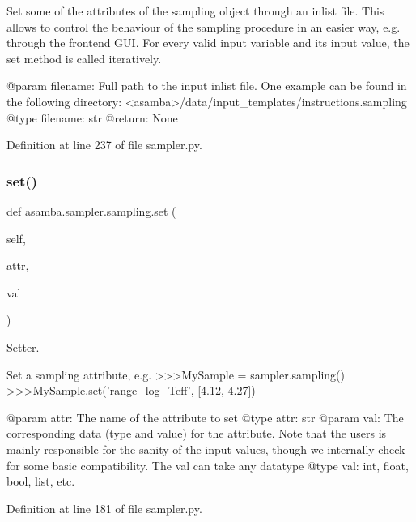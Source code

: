 \begin{DoxyVerb}Set some of the attributes of the sampling object through an inlist file. This allows to control
the behaviour of the sampling procedure in an easier way, e.g. through the frontend GUI. For every
valid input variable and its input value, the set method is called iteratively.

@param filename: Full path to the input inlist file. One example can be found in the following 
   directory: <asamba>/data/input_templates/instructions.sampling
@type filename: str
@return: None
\end{DoxyVerb}
 

Definition at line 237 of file sampler.\+py.

\mbox{\label{classasamba_1_1sampler_1_1sampling_a682af8a360751e2fb6dd215fe571ea43}} 
\subsubsection{\texorpdfstring{set()}{set()}}
{\footnotesize\ttfamily def asamba.\+sampler.\+sampling.\+set (\begin{DoxyParamCaption}\item[{}]{self,  }\item[{}]{attr,  }\item[{}]{val }\end{DoxyParamCaption})}



Setter. 

\begin{DoxyVerb}Set a sampling attribute, e.g.
>>>MySample = sampler.sampling()
>>>MySample.set('range_log_Teff', [4.12, 4.27])

@param attr: The name of the attribute to set
@type attr: str
@param val: The corresponding data (type and value) for the attribute. 
   Note that the users is mainly responsible for the sanity of the input values, 
   though we internally check for some basic compatibility. The val can take any
   datatype
@type val: int, float, bool, list, etc.
\end{DoxyVerb}
 

Definition at line 181 of file sampler.\+py.

\mbox{\label{classasamba_1_1sampler_1_1sampling_ae0e3548d71adf58b309904e65b0e6e8c}} 
